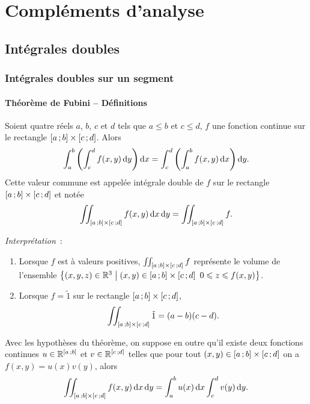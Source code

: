\chapter{Compléments d'analyse}
\label{chap:complementsanalyse}
\minitoc
\minilof
\minilot
\section{Intégrales doubles}
\subsection{Intégrales doubles sur un segment}
\subsubsection{Théorème de Fubini -- Définitions}
\begin{theo}[Admis]
  Soient quatre réels \(a\), \(b\), \(c\) et \(d\) tels que \(a\leqslant b\) et \(c \leqslant d\), \(f\) une fonction continue sur le rectangle \(\left[ a \, ;  b \right] \times \left[ c \, ;  d \right]\). Alors
  \begin{equation}
    \int_a^b\left(\int_c^d f(x,y)\mathop{}\mathopen{}\mathrm{d} y \right)\mathop{}\mathopen{}\mathrm{d} x = \int_c^d\left(\int_a^b f(x,y)\mathop{}\mathopen{}\mathrm{d} x\right)\mathop{}\mathopen{}\mathrm{d} y. 
  \end{equation}
Cette valeur commune est appelée intégrale double de \(f\) sur le rectangle \(\left[ a \, ;  b \right] \times \left[ c \, ;  d \right]\) et notée
\begin{equation}
  \iint_{\left[ a \, ;  b \right] \times \left[ c \, ;  d \right]}f(x,y) \mathop{}\mathopen{}\mathrm{d} x \mathop{}\mathopen{}\mathrm{d} y = \iint_{\left[ a \, ;  b \right] \times \left[ c \, ;  d \right]}f.
\end{equation}
\end{theo}
\emph{Interprétation}~:
\begin{enumerate}
\item Lorsque \(f\) est à valeurs positives, \(\iint_{\left[ a \, ;  b \right] \times \left[ c \, ;  d \right]}f\) représente le volume de l'ensemble \(\left\{(x,y,z)\in\mathbb{R}^3\mathrel{}\middle|\mathrel{}(x,y) \in \left[ a \, ;  b \right] \times \left[ c \, ;  d \right] \ 0 \leqslant z \leqslant f(x,y)\right\}\).
\item Lorsque \(f=\tilde{1}\) sur le rectangle \(\left[ a \, ;  b \right] \times \left[ c \, ;  d \right]\),
  \begin{equation}
     \iint_{\left[ a \, ;  b \right] \times \left[ c \, ;  d \right]}\tilde{1}=(a-b)(c-d).
  \end{equation}
\end{enumerate}
\begin{corth}
  Avec les hypothèses du théorème, on suppose en outre qu'il existe deux fonctions continues \(u \in \mathbb{R}^{\left[ a \, ;  b \right]}\) et \(v \in \mathbb{R}^{\left[ c \, ;  d \right]}\) telles que pour tout \((x, y) \in \left[ a \, ;  b \right] \times \left[ c \, ;  d \right]\) on a \(f(x,y)=u(x)v(y)\), alors
  \begin{equation}
    \iint_{\left[ a \, ;  b \right] \times \left[ c \, ;  d \right]} f(x,y)\mathop{}\mathopen{}\mathrm{d} x \mathop{}\mathopen{}\mathrm{d} y = \int_a^b u(x)\mathop{}\mathopen{}\mathrm{d} x \int_c^d v(y)\mathop{}\mathopen{}\mathrm{d} y.
  \end{equation}
\end{corth}

